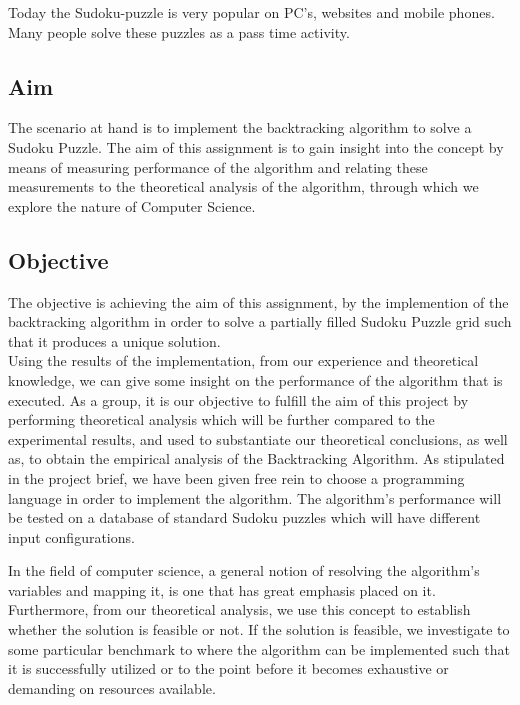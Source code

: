 \documentclass[12pt]{article}
\begin{document}
\begin{flushleft}
Today the Sudoku-puzzle is very popular on PC's, websites and mobile phones. Many people solve these puzzles as a pass time activity.
\end{flushleft}

 
\subsection{Aim}
\begin{flushleft}
The scenario at hand is to implement the backtracking algorithm to solve a Sudoku Puzzle. The aim of this assignment is to gain insight into the concept by means of measuring performance of the algorithm and relating these  measurements to the theoretical analysis of the algorithm, through which we explore the nature of Computer Science. 
\end{flushleft}
\subsection{Objective}
\begin{flushleft}
The objective is achieving the aim of this assignment, by the implemention of the backtracking algorithm in order to solve a partially filled Sudoku Puzzle grid such that it produces a unique solution. \\
Using the results of the implementation, from our experience and theoretical knowledge, we can give some insight on the performance of the algorithm that is executed. As a group, it is our objective to fulfill the aim of this project by performing theoretical analysis which will be further compared to the experimental results, and used to substantiate our theoretical conclusions, as well as, to obtain the empirical analysis of the Backtracking Algorithm. As stipulated in the project brief, we have been given free rein to choose a programming language in order to implement the algorithm. The algorithm's performance will be tested on a database of standard Sudoku puzzles which will have different input configurations. 
\end{flushleft}	

\begin{flushleft}
In the field of computer science, a general notion of resolving the algorithm's variables and mapping it, is one that has great emphasis placed on it. Furthermore, from our theoretical analysis, we use this concept to establish whether the solution is feasible or not. If the solution is feasible, we investigate to some particular benchmark to where the algorithm can be implemented such that it is successfully utilized or to the point before it becomes exhaustive or demanding on resources available. 
\end{flushleft}
\end{document}
